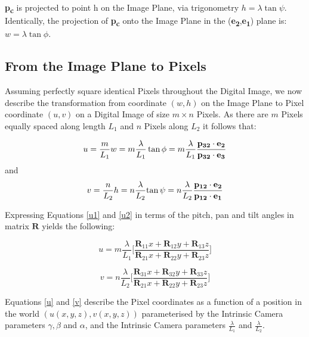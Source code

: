 \documentclass[12pt]{article}
\newcommand{\mtx}[1]{\ensuremath{\mathbf{#1}}}
\begin{document}
\textbf{p\textsubscript{c}} is projected to point h on the Image Plane, via trigonometry $h = \lambda\tan\psi$. Identically, the projection of \textbf{p\textsubscript{c}} onto the Image Plane in the (\textbf{e\textsubscript{2}},\textbf{e\textsubscript{1}}) plane is: $w = \lambda\tan\phi$.

\subsection{From the Image Plane to Pixels}

Assuming perfectly square identical Pixels throughout the Digital Image, we now describe the transformation from coordinate $(w,h)$ on the Image Plane to Pixel coordinate $(u,v)$ on a Digital Image of size $m\times n$ Pixels. 
As there are $m$ Pixels equally spaced along length $L_1$ and $n$ Pixels along $L_2$ it follows that:

\begin{equation}\label{u1}
u = \frac{m}{L_1}w = m\frac{\lambda}{L_1}\tan\phi
 = m\frac{\lambda}{L_1} 
\frac{\textbf{p\textsubscript{32}}\cdot\textbf{e\textsubscript{2}}}
{\textbf{p\textsubscript{32}}\cdot\textbf{e\textsubscript{3}}}
\end{equation}
and
\begin{equation}\label{u2}
v = \frac{n}{L_2}h=n\frac{\lambda}{L_2}{\tan\psi}
 = n\frac{\lambda}{L_2}
 \frac{\textbf{p\textsubscript{12}}\cdot\textbf{e\textsubscript{2}}}
{\textbf{p\textsubscript{12}}\cdot\textbf{e\textsubscript{1}}}
\end{equation}

Expressing Equations \ref{u1} and \ref{u2} in terms of the pitch, pan and tilt angles in matrix $\mtx{R}$ yields the following:

\begin{equation}\label{u}
u = m\frac{\lambda}{L_1}
\bigg[ \frac{\mtx{R}_{11}x+ \mtx{R}_{12}y + \mtx{R}_{13}z}
{\mtx{R}_{21}x+ \mtx{R}_{22}y + \mtx{R}_{23}z} \bigg]
\end{equation}

\begin{equation}\label{v}
v= n\frac{\lambda}{L_2}
\bigg[ \frac{\mtx{R}_{31}x+ \mtx{R}_{32}y + \mtx{R}_{33}z}
{\mtx{R}_{21}x+ \mtx{R}_{22}y + \mtx{R}_{23}z} \bigg]
\end{equation}

Equations \ref{u} and \ref{v} describe the Pixel coordinates as a function of a position in the world $(u(x,y,z),v(x,y,z))$ parameterised by the Intrinsic Camera parameters $\gamma, \beta$ and $\alpha$, and the Intrinsic Camera parameters $\frac{\lambda}{L_1}$ and $\frac{\lambda}{L_2}$.
\end{document}
